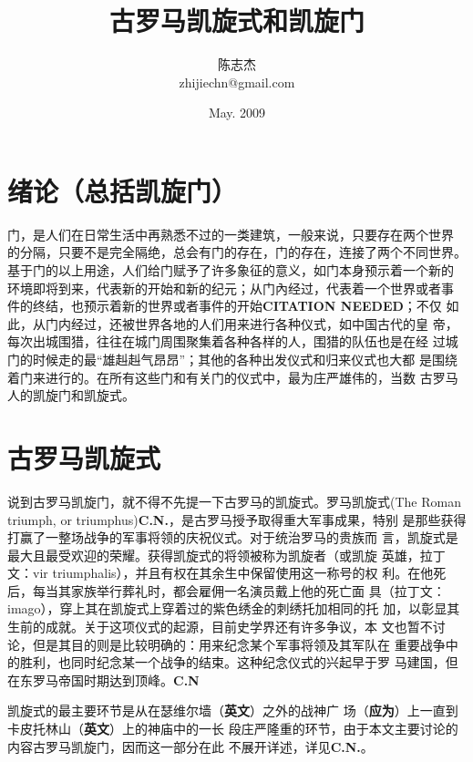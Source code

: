 \documentclass[a4paper,dvipdfm]{article}
\newcommand{\wuhao}{\fontsize{10.5pt}{1.3\baselineskip}\selectfont}
\begin{document}

\wuhao

\title{古罗马凯旋式和凯旋门}
\author{陈志杰 \\ zhijiechn@gmail.com}
\date{May. 2009}

\maketitle

\tableofcontents

\section{绪论（总括凯旋门）}

门，是人们在日常生活中再熟悉不过的一类建筑，一般来说，只要存在两个世界
的分隔，只要不是完全隔绝，总会有门的存在，门的存在，连接了两个不同世界。
基于门的以上用途，人们给门赋予了许多象征的意义，如门本身预示着一个新的
环境即将到来，代表新的开始和新的纪元；从门內经过，代表着一个世界或者事
件的终结，也预示着新的世界或者事件的开始\textbf{CITATION NEEDED}；不仅
如此，从门内经过，还被世界各地的人们用来进行各种仪式，如中国古代的皇
帝，每次出城围猎，往往在城门周围聚集着各种各样的人，围猎的队伍也是在经
过城门的时候走的最``雄赳赳气昂昂''；其他的各种出发仪式和归来仪式也大都
是围绕着门来进行的。在所有这些门和有关门的仪式中，最为庄严雄伟的，当数
古罗马人的凯旋门和凯旋式。

\section{古罗马凯旋式}

说到古罗马凯旋门，就不得不先提一下古罗马的凯旋式。罗马凯旋式(The Roman
triumph, or triumphus)\textbf{C.N.}，是古罗马授予取得重大军事成果，特别
是那些获得打赢了一整场战争的军事将领的庆祝仪式。对于统治罗马的贵族而
言，凯旋式是最大且最受欢迎的荣耀。获得凯旋式的将领被称为凯旋者（或凯旋
英雄，拉丁文：vir triumphalis），并且有权在其余生中保留使用这一称号的权
利。在他死后，每当其家族举行葬礼时，都会雇佣一名演员戴上他的死亡面
具（拉丁文：imago），穿上其在凯旋式上穿着过的紫色绣金的刺绣托加相同的托
加，以彰显其生前的成就。关于这项仪式的起源，目前史学界还有许多争议，本
文也暂不讨论，但是其目的则是比较明确的：用来纪念某个军事将领及其军队在
重要战争中的胜利，也同时纪念某一个战争的结束。这种纪念仪式的兴起早于罗
马建国，但在东罗马帝国时期达到顶峰。\textbf{C.N}

凯旋式的最主要环节是从在瑟维尔墙（\textbf{英文}）之外的战神广
场（\textbf{应为}）上一直到卡皮托林山（\textbf{英文}）上的神庙中的一长
段庄严隆重的环节，由于本文主要讨论的内容古罗马凯旋门，因而这一部分在此
不展开详述，详见\textbf{C.N.}。
\end{document}
